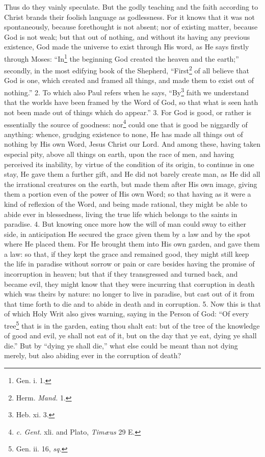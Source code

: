 Thus do they vainly speculate. But the godly teaching and the faith according to Christ brands their foolish language as godlessness. For it knows that it was not spontaneously, because forethought is not absent; nor of existing matter, because God is not weak; but that out of nothing, and without its having any previous existence, God made the universe to exist through His word, as He says firstly through Moses: “In\footnote{Gen. i. 1.} the beginning God created the heaven and the earth;” secondly, in the most edifying book of the Shepherd, “First\footnote{Herm. \emph{Mand.} 1.} of all believe that God is one, which created and framed all things, and made them to exist out of nothing.” 2. To which also Paul refers when he says, “By\footnote{Heb. xi. 3.} faith we understand that the worlds have been framed by the Word of God, so that what is seen hath not been made out of things which do appear.” 3. For God is good, or rather is essentially the source of goodness: nor\footnote{\emph{c. Gent.} xli. and Plato, \emph{Timæus} 29 E.} could one that is good be niggardly of anything: whence, grudging existence to none, He has made all things out of nothing by His own Word, Jesus Christ our Lord. And among these, having taken especial pity, above all things on earth, upon the race of men, and having perceived its inability, by virtue of the condition of its origin, to continue in one stay, He gave them a further gift, and He did not barely create man, as He did all the irrational creatures on the earth, but made them after His own image, giving them a portion even of the power of His own Word; so that having as it were a kind of reflexion of the Word, and being made rational, they might be able to abide ever in blessedness, living the true life which belongs to the saints in paradise. 4. But knowing once more how the will of man could sway to either side, in anticipation He secured the grace given them by a law and by the spot where He placed them. For He brought them into His own garden, and gave them a law: so that, if they kept the grace and remained good, they might still keep the life in paradise without sorrow or pain or care besides having the promise of incorruption in heaven; but that if they transgressed and turned back, and became evil, they might know that they were incurring that corruption in death which was theirs by nature: no longer to live in paradise, but cast out of it from that time forth to die and to abide in death and in corruption. 5. Now this is that of which Holy Writ also gives warning, saying in the Person of God: “Of every tree\footnote{Gen. ii. 16, \emph{sq.}} that is in the garden, eating thou shalt eat: but of the tree of the knowledge of good and evil, ye shall not eat of it, but on the day that ye eat, dying ye shall die.” But by “dying ye shall die,” what else could be meant than not dying merely, but also abiding ever in the corruption of death?

